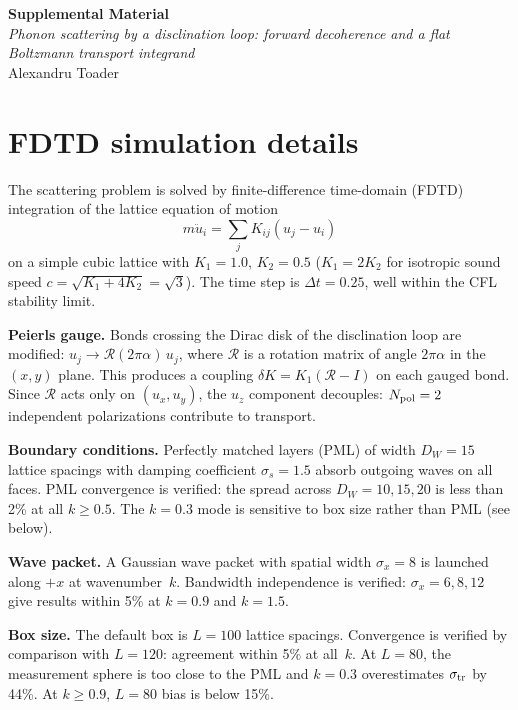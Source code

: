 \documentclass[11pt]{article}
\begin{document}
\begin{center}
{\large\bfseries Supplemental Material}\\[6pt]
{\itshape Phonon scattering by a disclination loop: forward decoherence
and a flat Boltzmann transport integrand}\\[4pt]
Alexandru Toader
\end{center}
\medskip

\section{FDTD simulation details}
\label{sec:fdtd}

The scattering problem is solved by finite-difference time-domain (FDTD)
integration of the lattice equation of motion
%
\begin{equation}
m\ddot{u}_i = \sum_j K_{ij}(u_j - u_i)
\end{equation}
%
on a simple cubic lattice with $K_1 = 1.0$, $K_2 = 0.5$ ($K_1 = 2K_2$ for
isotropic sound speed $c = \sqrt{K_1 + 4K_2} = \sqrt{3}$). The time step is
$\Delta t = 0.25$, well within the CFL stability limit.

\textbf{Peierls gauge.}
Bonds crossing the Dirac disk of the disclination loop are modified:
$u_j \to \mathcal{R}(2\pi\alpha)\,u_j$, where $\mathcal{R}$ is a rotation
matrix of angle $2\pi\alpha$ in the $(x,y)$ plane. This produces a coupling
$\delta K = K_1(\mathcal{R} - I)$ on each gauged bond. Since $\mathcal{R}$
acts only on $(u_x, u_y)$, the $u_z$ component decouples:
$N_{\rm pol} = 2$ independent polarizations contribute to transport.

\textbf{Boundary conditions.}
Perfectly matched layers (PML) of width $D_W = 15$ lattice spacings with
damping coefficient $\sigma_s = 1.5$ absorb outgoing waves on all faces. PML
convergence is verified: the spread across $D_W = 10, 15, 20$ is less than
2\% at all $k \geq 0.5$. The $k = 0.3$ mode is sensitive to box size rather
than PML (see below).

\textbf{Wave packet.}
A Gaussian wave packet with spatial width $\sigma_x = 8$ is launched along
$+x$ at wavenumber~$k$. Bandwidth independence is verified: $\sigma_x = 6,
8, 12$ give results within 5\% at $k = 0.9$ and $k = 1.5$.

\textbf{Box size.}
The default box is $L = 100$ lattice spacings. Convergence is verified by
comparison with $L = 120$: agreement within 5\% at all~$k$. At $L = 80$,
the measurement sphere is too close to the PML and $k = 0.3$ overestimates
$\sigma_{\rm tr}$ by 44\%. At $k \geq 0.9$, $L = 80$ bias is below 15\%.
\end{document}
